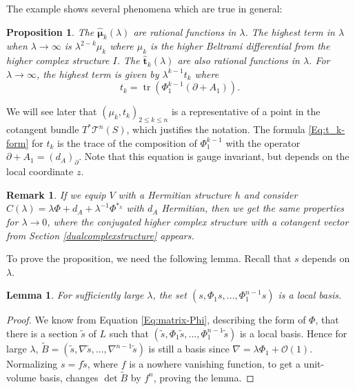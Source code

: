 \documentclass[11pt]{amsart}
\newtheorem{lemma}[thm]{Lemma}
\newtheorem{prop}[thm]{Proposition}
\newtheorem{Remark}[thm]{Remark}
\numberwithin{thm}{section} %
\numberwithin{equation}{section} %
\numberwithin{figure}{section} %
\renewcommand*{\l}{\lambda}
\newcommand*{\mc}{\mathcal}
\newcommand*{\cotang}{T^*\mc{T}^n(S)}
\DeclareMathOperator{\tr}{tr}
\begin{document}
The example shows several phenomena which are true in general: 
\begin{prop}\label{parametrisationlambda}
The $\bm\hat{\mu}_k(\l)$ are rational functions in $\l$. The highest term in $\l$ when $\l \rightarrow \infty$ is $\l^{2-k}\mu_k$ where $\mu_k$ is the higher Beltrami differential from the higher complex structure $I$. 
The $\bm\hat{t}_k(\l)$ are also rational functions in $\l$. For $\l \rightarrow \infty$, the highest term is given by $\l^{k-1}t_k$ where 
\begin{equation}\label{Eq:t_k-form}
t_k=\tr(\Phi_1^{k-1}(\partial+A_1)).
\end{equation}
\end{prop}

We will see later that $(\mu_k, t_k)_{2\leq k\leq n}$ is a representative of a point in the cotangent bundle $\cotang$, which justifies the notation. The formula \eqref{Eq:t_k-form} for $t_k$ is the trace of the composition of $\Phi_1^{k-1}$ with the operator $\partial+A_1=(d_A)_{\partial}$. Note that this equation is gauge invariant, but depends on the local coordinate $z$.

\begin{Remark}
If we equip $V$ with a Hermitian structure $h$ and consider $C(\l)=\l\Phi+d_A+\l^{-1}\Phi^{*_h}$ with $d_A$ Hermitian, then we get the same properties for $\l\to 0$, where the conjugated higher complex structure with a cotangent vector from Section \ref{dualcomplexstructure} appears. 
\end{Remark}

To prove the proposition, we need the following lemma. Recall that $s$ depends on $\l$.
\begin{lemma}\label{Lemma:basis}
For sufficiently large $\l$, the set $(s,\Phi_1s,...,\Phi_1^{n-1}s)$ is a local basis.
\end{lemma}
\begin{proof}
We know from Equation \eqref{Eq:matrix-Phi}, describing the form of $\Phi$, that there is a section $\tilde{s}$ of $L$ such that $(\tilde{s},\Phi_1\tilde{s},...,\Phi_1^{n-1}\tilde{s})$ is a local basis. Hence for large $\l$, $\tilde{B}=(\tilde{s},\nabla\tilde{s},...,\nabla^{n-1}\tilde{s})$ is still a basis since $\nabla=\l\Phi_1+\mathcal{O}(1)$. Normalizing $s=f\tilde{s}$, where $f$ is a nowhere vanishing function, to get a unit-volume basis, changes $\det \tilde{B}$ by $f^n$, proving the lemma.
\end{proof}
\end{document}
